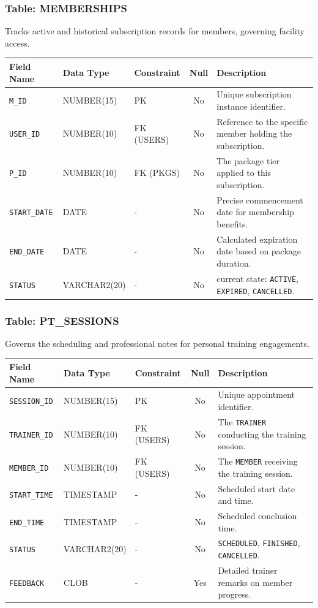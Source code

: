 \documentclass[
  12pt,
  a4paperpaper,
]{report}
\newcounter{none} %
\begin{document}
\subsubsection{Table: MEMBERSHIPS}
Tracks active and historical subscription records for members, governing facility access.

{\def\LTcaptype{none}
\begin{longtable}[]{@{}lllc p{5.5cm}@{}}
\hline
\textbf{Field Name} & \textbf{Data Type} & \textbf{Constraint} & \textbf{Null} & \textbf{Description} \\
\hline
\endhead
\hline
\endlastfoot
\texttt{M\_ID} & NUMBER(15) & PK & No & Unique subscription instance identifier. \\
\texttt{USER\_ID} & NUMBER(10) & FK (USERS) & No & Reference to the specific member holding the subscription. \\
\texttt{P\_ID} & NUMBER(10) & FK (PKGS) & No & The package tier applied to this subscription. \\
\texttt{START\_DATE} & DATE & - & No & Precise commencement date for membership benefits. \\
\texttt{END\_DATE} & DATE & - & No & Calculated expiration date based on package duration. \\
\texttt{STATUS} & VARCHAR2(20) & - & No & current state: \texttt{ACTIVE}, \texttt{EXPIRED}, \texttt{CANCELLED}. \\
\hline
\end{longtable}
}

\subsubsection{Table: PT\_SESSIONS}
Governs the scheduling and professional notes for personal training engagements.

{\def\LTcaptype{none}
\begin{longtable}[]{@{}lllc p{5.5cm}@{}}
\hline
\textbf{Field Name} & \textbf{Data Type} & \textbf{Constraint} & \textbf{Null} & \textbf{Description} \\
\hline
\endhead
\hline
\endlastfoot
\texttt{SESSION\_ID} & NUMBER(15) & PK & No & Unique appointment identifier. \\
\texttt{TRAINER\_ID} & NUMBER(10) & FK (USERS) & No & The \texttt{TRAINER} conducting the training session. \\
\texttt{MEMBER\_ID} & NUMBER(10) & FK (USERS) & No & The \texttt{MEMBER} receiving the training session. \\
\texttt{START\_TIME} & TIMESTAMP & - & No & Scheduled start date and time. \\
\texttt{END\_TIME} & TIMESTAMP & - & No & Scheduled conclusion time. \\
\texttt{STATUS} & VARCHAR2(20) & - & No & \texttt{SCHEDULED}, \texttt{FINISHED}, \texttt{CANCELLED}. \\
\texttt{FEEDBACK} & CLOB & - & Yes & Detailed trainer remarks on member progress. \\
\hline
\end{longtable}
}
\end{document}
